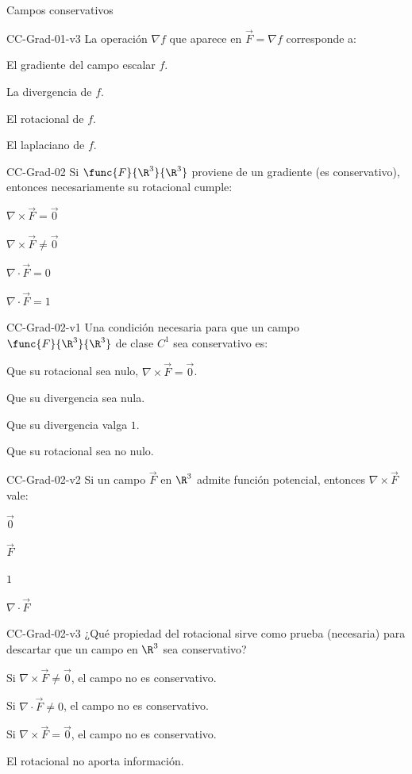 \documentclass[a4,11pt]{aleph-notas}
\begin{document}
\begin{quiz}{Campos conservativos}
\begin{multi}[]%
    {CC-Grad-01-v3}
    La operación $\nabla f$ que aparece en $\vec{F}=\nabla f$ corresponde a:
    \item* El gradiente del campo escalar $f$.
    \item La divergencia de $f$.
    \item El rotacional de $f$.
    \item El laplaciano de $f$.
\end{multi}

\begin{multi}[]%
    {CC-Grad-02}
    Si $\func{F}{\R^3}{\R^3}$ proviene de un gradiente (es conservativo), entonces necesariamente su rotacional cumple:
    \item* $\nabla \times \vec{F} = \vec{0}$
    \item $\nabla \times \vec{F} \neq \vec{0}$
    \item $\nabla \cdot \vec{F} = 0$
    \item $\nabla \cdot \vec{F} = 1$
\end{multi}

\begin{multi}[]%
    {CC-Grad-02-v1}
    Una condición necesaria para que un campo $\func{F}{\R^3}{\R^3}$ de clase $C^1$ sea conservativo es:
    \item* Que su rotacional sea nulo, $\nabla\times\vec{F}=\vec{0}$.
    \item Que su divergencia sea nula.
    \item Que su divergencia valga $1$.
    \item Que su rotacional sea no nulo.
\end{multi}

\begin{multi}[]%
    {CC-Grad-02-v2}
    Si un campo $\vec{F}$ en $\R^3$ admite función potencial, entonces $\nabla\times\vec{F}$ vale:
    \item* $\vec{0}$
    \item $\vec{F}$
    \item $1$
    \item $\nabla\cdot\vec{F}$
\end{multi}

\begin{multi}[]%
    {CC-Grad-02-v3}
    ¿Qué propiedad del rotacional sirve como prueba (necesaria) para descartar que un campo en $\R^3$ sea conservativo?
    \item* Si $\nabla\times\vec{F}\neq\vec{0}$, el campo no es conservativo.
    \item Si $\nabla\cdot\vec{F}\neq 0$, el campo no es conservativo.
    \item Si $\nabla\times\vec{F}=\vec{0}$, el campo no es conservativo.
    \item El rotacional no aporta información.
\end{multi}


\end{quiz}
\end{document}
